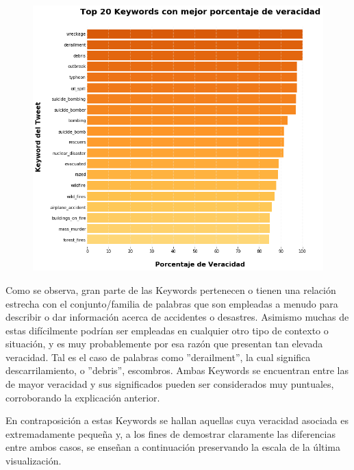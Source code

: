 \documentclass[titlepage,a4paper]{article}
\begin{document}
    \begin{figure}[H]
    \centering
    \includegraphics[width=1\textwidth]{graficos/Analisis de Keyword/top_10_keywords_con_mejor_porcentaje_de_veracidad.png}
    \caption{} 
    \end{figure}
    
    Como se observa, gran parte de las Keywords pertenecen o tienen una relación estrecha con el conjunto/familia de palabras que son empleadas a menudo para describir o dar información acerca de accidentes o desastres. Asimismo muchas de estas difícilmente podrían ser empleadas en cualquier otro tipo de contexto o situación, y es muy probablemente por esa razón que presentan tan elevada veracidad. Tal es el caso de palabras como ''derailment'', la cual significa descarrilamiento, o ''debris'', escombros. Ambas Keywords se encuentran entre las de mayor veracidad y sus significados pueden ser considerados muy puntuales, corroborando la explicación anterior. 
    
    En contraposición a estas Keywords se hallan aquellas cuya veracidad asociada es extremadamente pequeña y, a los fines de demostrar claramente las diferencias entre ambos casos, se enseñan a continuación preservando la escala de la última visualización.
    
\end{document}
